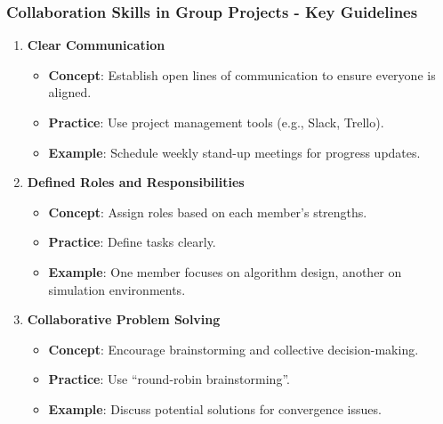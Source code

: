\documentclass[aspectratio=169]{beamer}
\begin{document}
\begin{frame}[fragile]
    \frametitle{Collaboration Skills in Group Projects - Key Guidelines}
    \begin{enumerate}
        \item \textbf{Clear Communication}
        \begin{itemize}
            \item \textbf{Concept}: Establish open lines of communication to ensure everyone is aligned.
            \item \textbf{Practice}: Use project management tools (e.g., Slack, Trello).
            \item \textbf{Example}: Schedule weekly stand-up meetings for progress updates.
        \end{itemize}

        \item \textbf{Defined Roles and Responsibilities}
        \begin{itemize}
            \item \textbf{Concept}: Assign roles based on each member’s strengths.
            \item \textbf{Practice}: Define tasks clearly.
            \item \textbf{Example}: One member focuses on algorithm design, another on simulation environments.
        \end{itemize}
        
        \item \textbf{Collaborative Problem Solving}
        \begin{itemize}
            \item \textbf{Concept}: Encourage brainstorming and collective decision-making.
            \item \textbf{Practice}: Use “round-robin brainstorming”.
            \item \textbf{Example}: Discuss potential solutions for convergence issues.
        \end{itemize}
    \end{enumerate}
\end{frame}
\end{document}
